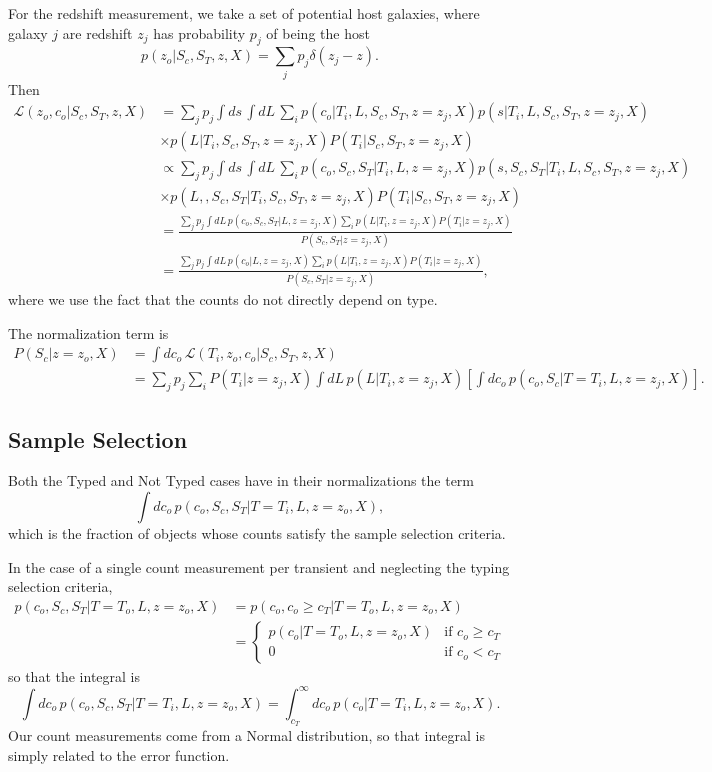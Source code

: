\documentclass[preprint,3p]{elsarticle}
\begin{document}
For the redshift measurement, we take a set of potential host galaxies, where galaxy $j$
are redshift $z_j$ has probability $p_j$ of being the host
\begin{equation}
p(z_o|S_c, S_T, z, X) = \sum_j   p_j\delta(z_j-z).
\end{equation}
Then
\begin{align}
\mathcal{L}(z_o,c_o | S_c, S_T, z, X) & =  \sum_j p_j \int ds \, \int dL \,\sum_{i} p(c_o | T_i, L, S_c, S_T, z=z_j, X) p(s | T_i, L, S_c, S_T, z=z_j, X) \\
& \times p(L |  T_i,  S_c, S_T,  z=z_j, X) P(T_i|S_c, S_T, z=z_j, X) \\
& \propto  \sum_j p_j \int ds \, \int dL \,\sum_{i} p(c_o, S_c, S_T | T_i, L, z=z_j, X) p(s, S_c, S_T | T_i, L, S_c, S_T, z=z_j, X) \\
& \times p(L,, S_c, S_T |  T_i,  S_c, S_T,  z=z_j, X) P(T_i|S_c, S_T, z=z_j, X) \\
&=  \frac{\sum_j p_j \int dL \, p(c_o, S_c, S_T | L, z=z_j, X) \sum_{i}  p(L|T_i, z=z_j, X) P(T_i|z=z_j, X)   }{P(S_c, S_T| z=z_j, X)}\\
&=  \frac{\sum_j p_j \int dL \, p(c_o | L, z=z_j, X) \sum_{i}  p(L|T_i, z=z_j, X) P(T_i|z=z_j, X)   }{P(S_c, S_T| z=z_j, X)},
\end{align}
where we use the fact that the counts do not directly depend on type.

The normalization term is
\begin{align}
P(S_c| z=z_o, X) & = \int dc_o \, \mathcal{L}(T_i,z_o,c_o | S_c, S_T, z, X)\\
& =  \sum_j p_j  \sum_{i} P(T_i|z=z_j, X)  \int dL \, p(L|T_i, z=z_j, X) 
\left[ \int dc_o \, p(c_o, S_c| T=T_i, L, z=z_j, X) \right].
\end{align}

\subsection{Sample Selection}
Both the Typed and Not Typed cases have in their normalizations the term
\begin{equation}
\int dc_o \, p(c_o,S_c, S_T | T=T_i, L, z=z_o, X),
\end{equation}
which is the fraction of objects whose counts satisfy the sample selection criteria.


In the case of a single count measurement per transient and neglecting the typing selection criteria,
\begin{align}
 p(c_o, S_c, S_T | T=T_o, L, z=z_o, X) &=  p(c_o, c_o \ge  c_T | T=T_o, L, z=z_o, X) \\
 &= \begin{cases}
   p(c_o | T=T_o, L, z=z_o, X) & \text{if } c_o \ge c_T \\
   0 & \text{if }  c_o < c_T
 \end{cases}
\end{align}
so that the integral is
\begin{equation}
\int dc_o \, p(c_o,S_c, S_T | T=T_i, L, z=z_o, X) = \int_{c_T}^\infty dc_o\,  p(c_o | T=T_i, L, z=z_o, X).
\end{equation}
Our count measurements come from a Normal distribution, so that integral is simply related to the error function.
\end{document}

